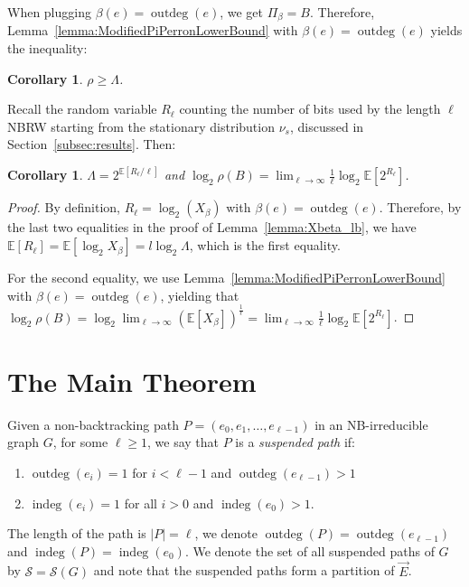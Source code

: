 \documentclass{article}
\newtheorem{corollary}[theorem]{Corollary}
\newcommand{\dirE}{\vec{E}}
\newcommand{\E}{\mathbb{E}} %
\DeclareMathOperator{\outdeg}{outdeg}
\DeclareMathOperator{\indeg}{indeg}
\begin{document}
\noindent
When plugging $\beta(e) = \outdeg(e)$, we get $\Pi_\beta = B$.
Therefore, Lemma~\ref{lemma:ModifiedPiPerronLowerBound} with $\beta(e) = \outdeg(e)$ yields the inequality:
\begin{corollary}\label{cor:rho_ge_lambda}
     $\rho \geq \Lambda$.    
\end{corollary}

\noindent
Recall the random variable $R_\ell$ counting the number of bits used by the length $\ell$ NBRW starting from the stationary distribution $\nu_s$,
discussed in Section~\ref{subsec:results}. Then:
\begin{corollary}\label{cor:Rl}
    $\Lambda = 2^{\E[R_{\ell}/\ell]}$ and $\log_2 \rho(B) = \lim_{\ell \rightarrow \infty} \frac{1}{\ell} \log_2 \E[2^{R_\ell}]$.
\end{corollary}

\begin{proof}
    By definition, $R_\ell = \log_2(X_\beta)$ with $\beta(e) = \outdeg(e)$. 
    Therefore, by the last two equalities in the proof of Lemma~\ref{lemma:Xbeta_lb}, we have $\E[R_\ell] = \E[\log_2 X_\beta] = l \log_2 \Lambda$, which is the first equality.
    
    For the second equality, we use Lemma~\ref{lemma:ModifiedPiPerronLowerBound} with $\beta(e) = \outdeg(e)$, 
    yielding that $\log_2 \rho(B) = \log_2 \lim_{\ell \rightarrow \infty} \left( \E[X_\beta] \right)^\frac{1}{\ell} = \lim_{\ell \rightarrow \infty} \frac{1}{\ell} \log_2 \E[2^{R_\ell}]$.
\end{proof}

\section{The Main Theorem}\label{sect:main_theorem}
    Given a non-backtracking path $P=(e_0,e_1 ,\ldots,e_{\ell-1})$ in an NB-irreducible graph $G$, for some $\ell \geq 1$, we say that $P$ is a \emph{suspended path} if:
    \begin{enumerate}
        \item $\outdeg(e_i) = 1$ for $i<\ell-1$ and $\outdeg(e_{\ell-1}) > 1$
        \item $\indeg(e_i)=1$ for all $i>0$ and $\indeg(e_0) > 1$.
    \end{enumerate}
    The length of the path is $|P|=\ell$, we denote $\outdeg(P) = \outdeg(e_{\ell-1})$ and $\indeg(P) = \indeg(e_0)$.
    We denote the set of all suspended paths of $G$ by $\mathcal{S}=\mathcal{S}(G)$ and note that the suspended paths form a partition of $\dirE$.
    
\end{document}
